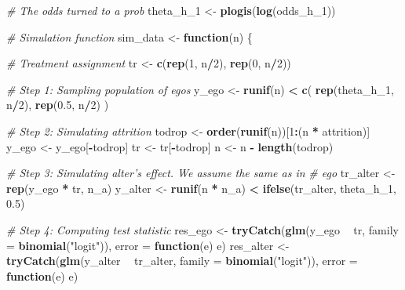 \documentclass[]{book}
\newenvironment{Shaded}{\begin{snugshade}}{\end{snugshade}}
\newcommand{\CommentTok}[1]{\textcolor[rgb]{0.56,0.35,0.01}{\textit{#1}}}
\newcommand{\ControlFlowTok}[1]{\textcolor[rgb]{0.13,0.29,0.53}{\textbf{#1}}}
\newcommand{\DataTypeTok}[1]{\textcolor[rgb]{0.13,0.29,0.53}{#1}}
\newcommand{\DecValTok}[1]{\textcolor[rgb]{0.00,0.00,0.81}{#1}}
\newcommand{\FloatTok}[1]{\textcolor[rgb]{0.00,0.00,0.81}{#1}}
\newcommand{\KeywordTok}[1]{\textcolor[rgb]{0.13,0.29,0.53}{\textbf{#1}}}
\newcommand{\NormalTok}[1]{#1}
\newcommand{\OperatorTok}[1]{\textcolor[rgb]{0.81,0.36,0.00}{\textbf{#1}}}
\newcommand{\StringTok}[1]{\textcolor[rgb]{0.31,0.60,0.02}{#1}}
\begin{document}
\begin{Shaded}
\begin{Highlighting}[]
\CommentTok{# The odds turned to a prob}
\NormalTok{theta_h_}\DecValTok{1}\NormalTok{ <-}\StringTok{ }\KeywordTok{plogis}\NormalTok{(}\KeywordTok{log}\NormalTok{(odds_h_}\DecValTok{1}\NormalTok{))}

\CommentTok{# Simulation function}
\NormalTok{sim_data <-}\StringTok{ }\ControlFlowTok{function}\NormalTok{(n) \{}

  \CommentTok{# Treatment assignment}
\NormalTok{  tr  <-}\StringTok{ }\KeywordTok{c}\NormalTok{(}\KeywordTok{rep}\NormalTok{(}\DecValTok{1}\NormalTok{, n}\OperatorTok{/}\DecValTok{2}\NormalTok{), }\KeywordTok{rep}\NormalTok{(}\DecValTok{0}\NormalTok{, n}\OperatorTok{/}\DecValTok{2}\NormalTok{))}

  \CommentTok{# Step 1: Sampling population of egos}
\NormalTok{  y_ego <-}\StringTok{ }\KeywordTok{runif}\NormalTok{(n) }\OperatorTok{<}\StringTok{ }\KeywordTok{c}\NormalTok{(}
    \KeywordTok{rep}\NormalTok{(theta_h_}\DecValTok{1}\NormalTok{, n}\OperatorTok{/}\DecValTok{2}\NormalTok{),}
    \KeywordTok{rep}\NormalTok{(}\FloatTok{0.5}\NormalTok{, n}\OperatorTok{/}\DecValTok{2}\NormalTok{)}
\NormalTok{  )}

  \CommentTok{# Step 2: Simulating attrition}
\NormalTok{  todrop <-}\StringTok{ }\KeywordTok{order}\NormalTok{(}\KeywordTok{runif}\NormalTok{(n))[}\DecValTok{1}\OperatorTok{:}\NormalTok{(n }\OperatorTok{*}\StringTok{ }\NormalTok{attrition)]}
\NormalTok{  y_ego  <-}\StringTok{ }\NormalTok{y_ego[}\OperatorTok{-}\NormalTok{todrop]}
\NormalTok{  tr     <-}\StringTok{ }\NormalTok{tr[}\OperatorTok{-}\NormalTok{todrop]}
\NormalTok{  n      <-}\StringTok{ }\NormalTok{n }\OperatorTok{-}\StringTok{ }\KeywordTok{length}\NormalTok{(todrop)}

  \CommentTok{# Step 3: Simulating alter's effect. We assume the same as in}
  \CommentTok{# ego}
\NormalTok{  tr_alter <-}\StringTok{ }\KeywordTok{rep}\NormalTok{(y_ego }\OperatorTok{*}\StringTok{ }\NormalTok{tr, n_a)}
\NormalTok{  y_alter  <-}\StringTok{ }\KeywordTok{runif}\NormalTok{(n }\OperatorTok{*}\StringTok{ }\NormalTok{n_a) }\OperatorTok{<}\StringTok{ }\KeywordTok{ifelse}\NormalTok{(tr_alter, theta_h_}\DecValTok{1}\NormalTok{, }\FloatTok{0.5}\NormalTok{)}

  \CommentTok{# Step 4: Computing test statistic}
\NormalTok{  res_ego   <-}\StringTok{ }\KeywordTok{tryCatch}\NormalTok{(}\KeywordTok{glm}\NormalTok{(y_ego }\OperatorTok{~}\StringTok{ }\NormalTok{tr, }\DataTypeTok{family =} \KeywordTok{binomial}\NormalTok{(}\StringTok{"logit"}\NormalTok{)), }\DataTypeTok{error =} \ControlFlowTok{function}\NormalTok{(e) e)}
\NormalTok{  res_alter <-}\StringTok{ }\KeywordTok{tryCatch}\NormalTok{(}\KeywordTok{glm}\NormalTok{(y_alter }\OperatorTok{~}\StringTok{ }\NormalTok{tr_alter, }\DataTypeTok{family =} \KeywordTok{binomial}\NormalTok{(}\StringTok{"logit"}\NormalTok{)), }\DataTypeTok{error =} \ControlFlowTok{function}\NormalTok{(e) e)}


\end{Highlighting}
\end{Shaded}
\end{document}
